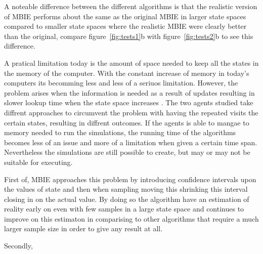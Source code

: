 A noteable difference between the different algorithms is that the realistic version of MBIE performs about the same as the original MBIE in larger state spaces compared to smaller state spaces where the realistic MBIE were clearly better than the original, compare figure~\ref{fig:tests1}b with figure~\ref{fig:tests2}b to see this difference. 

A pratical limitation today is the amount of space needed to keep all the states in the memory of the computer. With the constant increase of memory in today's computers its becomming less and less of a seriuos limitation. However, the problem arises when the information is needed as a result of updates resulting in slower lookup time when the state space increases \parencite{szepesvari2010algorithms}. The two agents studied take diffrent approaches to circumvent the problem with having the repeated visits the certain states, resulting in diffrent outcomes. If the agents is able to mangae to memory needed to run the simulations, the running time of the algorithms becomes less of an issue and more of a limitation when given a certain time span. Nevertheless the simulations are still possible to create, but may or may not be suitable for executing. 

First of, MBIE approaches this problem by introducing confidence intervals upon the values of state and then when sampling moving this shrinking this interval closing in on the actual value. By doing so the algorithm have an estimation of reality early on even with few samples in a large state space and continues to improve on this estimaton in comparising to other algorithms  that require a much larger sample size in order to give any result at all. 

Secondly, 
